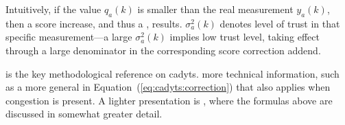Intuitively, if the  value $q_a(k)$ is smaller than
the real measurement $y_a(k)$, then a score increase, and thus a , results.
 $\sigma^2_a(k)$ denotes  level of trust in
that specific measurement---a large  $\sigma^2_a(k)$ implies
 low trust level, taking effect through a large denominator in the
corresponding score correction addend.

\citet[][]{floetteroed-2010e} is the key methodological reference on \gls{cadyts}.
 more technical information, such as a more general  in
Equation~(\ref{eq:cadyts:correction})\corr{,}{} that also applies when congestion
is present.
A  lighter presentation is 
\citet[][]{FloetteroedChenEtAl2011BehavioralCalibAndAnaNETS}, where the 
formulas above are discussed in somewhat greater detail.

